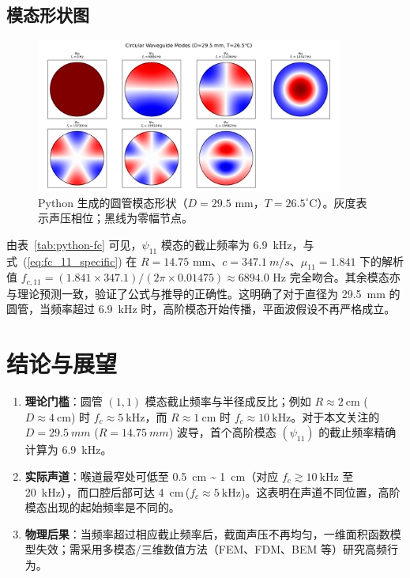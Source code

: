 \documentclass[12pt,a4paper]{article}
\begin{document}
\subsection{模态形状图}

\begin{figure}[h]
    \centering
    \includegraphics[width=0.9\textwidth]{../02-code/circle_modes.png}
    \caption{Python 生成的圆管模态形状（$D=29.5$ mm，$T=26.5^{\circ}$C）。灰度表示声压相位；黑线为零幅节点。}
    \label{fig:circ-modes}
\end{figure}

由表~\ref{tab:python-fc} 可见，$\psi_{11}$ 模态的截止频率为 \SI{6.9}{kHz}，与式~(\ref{eq:fc_11_specific}) 在 $R=14.75$ mm、$c=\SI{347.1}{m/s}$、$\mu_{11}=1.841$ 下的解析值 $f_{c,11} = (1.841 \times 347.1)/(2\pi \times 0.01475) \approx 6894.0$ Hz 完全吻合。其余模态亦与理论预测一致，验证了公式与推导的正确性。这明确了对于直径为 \SI{29.5}{mm} 的圆管，当频率超过 \SI{6.9}{kHz} 时，高阶模态开始传播，平面波假设不再严格成立。

\section{结论与展望}

\begin{enumerate}
    \item \textbf{理论门槛}：圆管 $(1,1)$ 模态截止频率与半径成反比；例如 $R\approx\SI{2}{\centi\meter}$ ($D\approx\SI{4}{\centi\meter}$) 时 $f_c\approx\SI{5}{\kilo\hertz}$，而 $R\approx\SI{1}{\centi\meter}$ 时 $f_c\approx\SI{10}{\kilo\hertz}$。对于本文关注的 $D=\SI{29.5}{mm}$ ($R=\SI{14.75}{mm}$) 波导，首个高阶模态 $(\psi_{11})$ 的截止频率精确计算为 \SI{6.9}{kHz}。
    \item \textbf{实际声道}：喉道最窄处可低至 \SI{0.5}{\centi\meter} \textasciitilde{} \SI{1}{\centi\meter}（对应 $f_c\gtrsim\SI{10}{\kilo\hertz}$ 至 \SI{20}{\kilo\hertz}），而口腔后部可达 \SI{4}{\centi\meter}$\,$($f_c\approx\SI{5}{\kilo\hertz}$)。这表明在声道不同位置，高阶模态出现的起始频率是不同的。
    \item \textbf{物理后果}：当频率超过相应截止频率后，截面声压不再均匀，一维面积函数模型失效；需采用多模态/三维数值方法（FEM、FDM、BEM 等）研究高频行为。
\end{enumerate}
\end{document}
